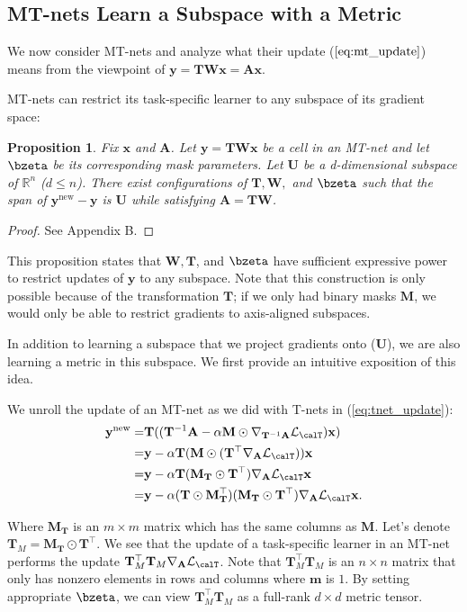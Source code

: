 \documentclass{article}
\newtheorem{prop}{Proposition}
\newcommand{\x}{\mathbf{x}}
\newcommand{\y}{\mathbf{y}}
\newcommand{\A}{\mathbf{A}}
\newcommand{\W}{\mathbf{W}}
\newcommand{\T}{\mathbf{T}}
\newcommand{\M}{\mathbf{M}}
\newcommand{\logit}{\bzeta}
\newcommand{\m}{\mathbf{m}}
\newcommand{\loss}{\mathcal{L}_{\calT}}
\newcommand{\U}{\mathbf{U}}
\newcommand{\mask}{\M}
\newcommand{\maskT}{\mask_{\T}}
\newcommand{\Rn}{\mathbb{R}^n}
\begin{document}
\subsection{MT-nets Learn a Subspace with a Metric}
\label{subsec:mtnet_analysis}
We now consider MT-nets and analyze what their update ($\ref{eq:mt_update}$) means from the viewpoint of $\y = \T \W \x = \A \x$.

MT-nets can restrict its task-specific learner to any subspace of its gradient space:

\begin{prop}
\label{prop}
Fix $\x$ and $\A$. 
Let $\y = \T \W \x$ be a cell in an MT-net and let $\logit$ be its corresponding mask parameters.
Let $\U$ be a d-dimensional subspace of $\Rn$ ($d \leq n$).
There exist configurations of $\T, \W,$ and $\logit$ such that the span of $\y^\text{new}-\y$ is $\U$ while satisfying $\A = \T \W$.
\end{prop}

\begin{proof}
See Appendix B.
\end{proof}

This proposition states that $\W, \T$, and $\logit$ have sufficient expressive power to restrict updates of $\y$ to any subspace.
Note that this construction is only possible because of the transformation $\T$; if we only had binary masks $\mask$, we would only be able to restrict gradients to axis-aligned subspaces.

In addition to learning a subspace that we project gradients onto ($\U$), we are also learning a metric in this subspace.
We first provide an intuitive exposition of this idea.

We unroll the update of an MT-net as we did with T-nets in (\ref{eq:tnet_update}):
\begin{align}
\y^\text{new} =& \T ((\T^{-1} \A - \alpha \mask \odot \nabla_{\T^{-1} \A} \loss) \x) \nonumber \\
=& \y - \alpha \T (\mask \odot (\T^{\top} \nabla_{\A} \loss)) \x \nonumber \\
=& \y - \alpha \T (\maskT \odot \T^{\top}) \nabla_{\A} \loss \x \nonumber \\
=& \y - \alpha (\T \odot \maskT^{\top}) (\maskT \odot \T^{\top}) \nabla_{\A} \loss \x.
\label{sumnet_metric}
\end{align}

Where $\maskT$ is an $m \times m$ matrix which has the same columns as $\mask$.
Let's denote $\T_M=\maskT \odot \T^{\top}$.
We see that the update of a task-specific learner in an MT-net performs the update $\T_M^\top \T_M \nabla_{\A} \loss$.
Note that $\T_M^\top \T_M$ is an $n \times n$ matrix that only has nonzero elements in rows and columns where $\m$ is $1$.
By setting appropriate $\logit$, we can view $\T_M^\top \T_M$ as a full-rank $d \times d$ metric tensor.
\end{document}
